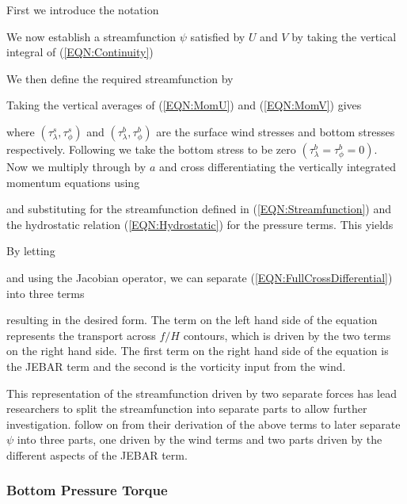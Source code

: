 \documentclass[..\report.tex]{subfiles}
\begin{document}
First we introduce the notation

We now establish a streamfunction $\psi$ satisfied by $U$ and $V$ by taking the vertical integral of (\ref{EQN:Continuity})

We then define the required streamfunction by

%
Taking the vertical averages of (\ref{EQN:MomU}) and (\ref{EQN:MomV}) gives


where $\left(\tau_\lambda^s, \tau_\phi^s\right)$ and $\left(\tau_\lambda^b, \tau_\phi^b\right)$ are the surface wind stresses and bottom stresses respectively. Following \citet{Greatbatch1991} we take the bottom stress to be zero $\left(\tau_\lambda^b=\tau_\phi^b=0\right)$.\\

Now we multiply through by $a$ and cross differentiating the vertically integrated momentum equations using

and substituting for the streamfunction defined in (\ref{EQN:Streamfunction}) and the hydrostatic relation (\ref{EQN:Hydrostatic}) for the pressure terms. This yields


By letting

and using the Jacobian operator, we can separate (\ref{EQN:FullCrossDifferential}) into three terms

resulting in the desired form. The term on the left hand side of the equation represents the transport across $f/H$ contours, which is driven by the two terms on the right hand side. The first term on the right hand side of the equation is the \gls{JEBAR} term and the second is the vorticity input from the wind.

This representation of the streamfunction driven by two separate forces has lead researchers to split the streamfunction into separate parts to allow further investigation. \citet{Greatbatch1991} follow on from their derivation of the above terms to later separate $\psi$ into three parts, one driven by the wind terms and two parts driven by the different aspects of the \gls{JEBAR} term. 








\subsubsection{Bottom Pressure Torque}
\label{SSSEC:BPT}
\end{document}
